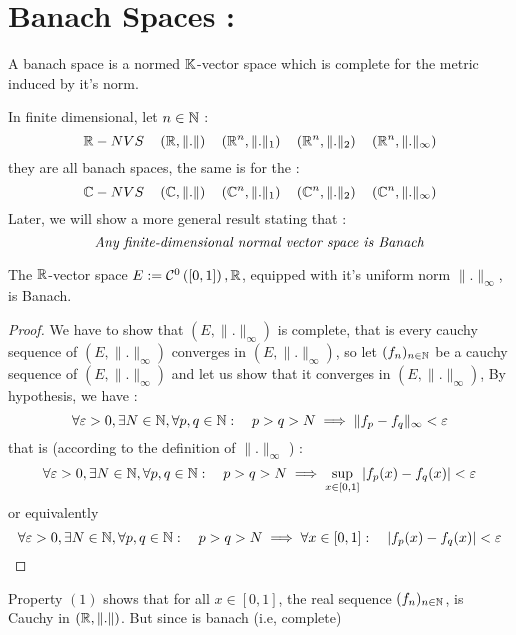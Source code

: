 \section{Banach Spaces : }
\begin{definition}[]
A banach space is a normed $\mathbb{K}$-vector space which is complete for the 
metric induced by it's norm.
\end{definition}
\begin{example}
In finite dimensional, let  $n \in \mathbb{N}$ : 
\[
\mathbb{R} -NVS \quad \left( \mathbb{R} , \| . \|  \right) \quad 
\left( \mathbb{R} ^n , \| . \| _{1} \right) \quad 
\left( 
	\mathbb{R} ^n , \| . \| _{2}
\right) \quad 
\left( 
	\mathbb{R} ^n , \| . \| _{\infty }
\right)
\]
they are all banach spaces, the same is for the :
\[
\mathbb{C} -NVS \quad 
\left( \mathbb{C} ,\| . \|  \right) \quad 
\left( 
	\mathbb{C} ^n , \| . \| _{1}
\right)
\quad 
\left( 
	\mathbb{C} ^{n}, \| . \| _{2}
\right) \quad 
\left( \mathbb{C} ^n , \| . \| _{\infty } \right)
\]
Later, we will show a more general result stating that : 
\[
 \text{ \it Any finite-dimensional normal vector space is Banach } 
\]
\normalfont
\end{example}
\begin{theorem}[]
	The $\mathbb{R} $-vector space 
	$E := \mathcal{C} ^{0} \left( [0,1] \right),\mathbb{R} $, equipped
	with it's uniform norm $\| . \| _{\infty }$, is Banach.
\end{theorem}
\begin{proof}
We have to show that 
$\left( E, \| . \| _{\infty } \right)$ is complete, that is every
cauchy sequence of $\left( E, \| . \| _{\infty } \right)$ converges
in $\left( E, \| . \| _{\infty } \right)$, so let $(f_{n})_{n \in \mathbb{N}}$ be
a cauchy sequence of $\left( E, \| . \|_{\infty }  \right)$ 
and let us show that it converges in $\left( E, \| . \| _{\infty } 
\right)$, By hypothesis, we have : 
\[
\forall \varepsilon  > 0, \exists N \in \mathbb{N}, 
\forall p,q \in \mathbb{N} : \quad 
p > q > N \implies 
\| f_{p} - f_{q} \|  _{\infty } < \varepsilon 
\]
that is (according to the definition of $\| . \|_{\infty } $ ) :
\[
\forall \varepsilon  > 0, \exists N \in \mathbb{N}, \forall p,q \in \mathbb{N} :
\quad 
p > q > N \implies \sup_{x \in [0,1]}  
\left| f_{p} (x) - f_{q}(x)  \right| < \varepsilon 
\]
or equivalently 
\[
\forall \varepsilon  > 0, \exists N \in \mathbb{N},
\forall p , q \in \mathbb{N}: \quad 
p > q > N \implies 
\forall x \in [0,1] : \quad 
\left| f_{p}(x) - f_{q}(x)  \right| < \varepsilon 
\]
\end{proof}
Property $(1)$ shows that for all $x \in [0,1]$, the real sequence
$(f_{n})_{n \in \mathbb{N}}$, is Cauchy in 
$\left( \mathbb{R} , \| .\|  \right)$. But since is banach (i.e, complete) 
